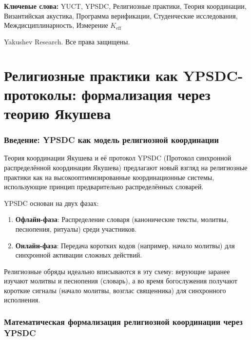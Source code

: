 \documentclass[12pt,a4paper]{article}
\begin{document}
\begin{titlepage}
\begin{center}
			\vspace{0cm}
			
			\noindent
			\small\textbf{Ключевые слова:} YUCT, YPSDC, Религиозные практики, Теория координации, Византийская акустика, Программа верификации, Студенческие исследования, Междисциплинарность, Измерение $K_{\mathrm{eff}}$
			
			\vspace{0.5cm}
			
			\noindent
			 Yakushev Research. Все права защищены.
		\end{center}
	\end{titlepage}
	
	\tableofcontents
	
	\newpage
	
	\part{Религиозные практики как YPSDC-протоколы: формализация через теорию Якушева}
	
	\section{Введение: YPSDC как модель религиозной координации}
	
	Теория координации Якушева и её протокол YPSDC (Протокол синхронной распределённой координации Якушева) предлагают новый взгляд на религиозные практики как на высокооптимизированные координационные системы, использующие принцип предварительно распределённых словарей.
	
	YPSDC основан на двух фазах:
	\begin{enumerate}
		\item \textbf{Офлайн-фаза}: Распределение словаря (канонические тексты, молитвы, песнопения, ритуалы) среди участников.
		\item \textbf{Онлайн-фаза}: Передача коротких кодов (например, начало молитвы) для синхронной активации сложных действий.
	\end{enumerate}
	
	Религиозные обряды идеально вписываются в эту схему: верующие заранее изучают молитвы и песнопения (словарь), а во время богослужения получают короткие сигналы (начало молитвы, возглас священника) для синхронного исполнения.
	
	\section{Математическая формализация религиозной координации через YPSDC}
	
\end{document}
